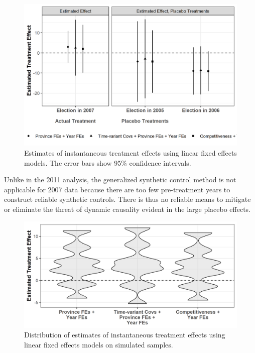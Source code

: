 \documentclass[12pt]{article}
\newcommand{\1}{\mathbbm{1}}
\begin{document}
\begin{figure}[!htbp]
	\centering
	\includegraphics[width=.75\textwidth]{figure/200202_lfe_placebo_2007.png}
	\captionsetup{singlelinecheck=off}
	\caption[Estimated placebo linear fixed effects treatment effects]{Estimates of instantaneous treatment effects using linear fixed effects models. The error bars show 95\% confidence intervals.}
	\label{fig:lfe_placebo_2007}
\end{figure}

Unlike in the 2011 analysis, the generalized synthetic control method \citep{Xu2017gsynth} is not applicable for 2007 data because there are too few pre-treatment years to construct reliable synthetic controls. There is thus no reliable means to mitigate or eliminate the threat of dynamic causality evident in the large placebo effects. 

\begin{figure}[!htbp]
	\centering
	\includegraphics[width=.75\textwidth]{figure/200202_impute_results_2007.png}
	\captionsetup{singlelinecheck=off}
	\caption[Estimated linear fixed effects treatment effects using simulated vote shares]{Distribution of estimates of instantaneous treatment effects using linear fixed effects models on simulated samples.}
	\label{fig:impute_results_2007}
\end{figure}
\end{document}
